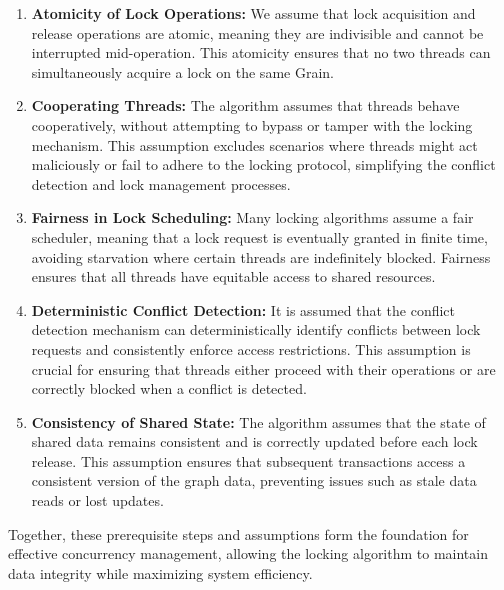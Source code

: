 \begin{enumerate}
    \item \textbf{Atomicity of Lock Operations:} We assume that lock acquisition and release operations are atomic, meaning they are indivisible and cannot be interrupted mid-operation. This atomicity ensures that no two threads can simultaneously acquire a lock on the same Grain.

    \item \textbf{Cooperating Threads:} The algorithm assumes that threads behave cooperatively, without attempting to bypass or tamper with the locking mechanism. This assumption excludes scenarios where threads might act maliciously or fail to adhere to the locking protocol, simplifying the conflict detection and lock management processes.
    
    \item  \textbf{Fairness in Lock Scheduling:} Many locking algorithms assume a fair scheduler, meaning that a lock request is eventually granted in finite time, avoiding starvation where certain threads are indefinitely blocked. Fairness ensures that all threads have equitable access to shared resources.

    \item \textbf{Deterministic Conflict Detection:}  It is assumed that the conflict detection mechanism can deterministically identify conflicts between lock requests and consistently enforce access restrictions. This assumption is crucial for ensuring that threads either proceed with their operations or are correctly blocked when a conflict is detected.
    
    \item \textbf{Consistency of Shared State:} The algorithm assumes that the state of shared data remains consistent and is correctly updated before each lock release. This assumption ensures that subsequent transactions access a consistent version of the graph data, preventing issues such as stale data reads or lost updates.
\end{enumerate}


Together, these prerequisite steps and assumptions form the foundation for effective concurrency management, allowing the locking algorithm to maintain data integrity while maximizing system efficiency.





